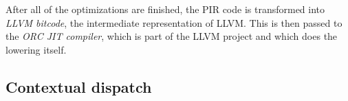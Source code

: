 After all of the optimizations are finished, the PIR code is transformed into \textit{LLVM bitcode}, the intermediate representation of LLVM. This is then passed to the \textit{ORC JIT compiler}, which is part of the LLVM project and which does the lowering itself.

\subsection{Contextual dispatch}
